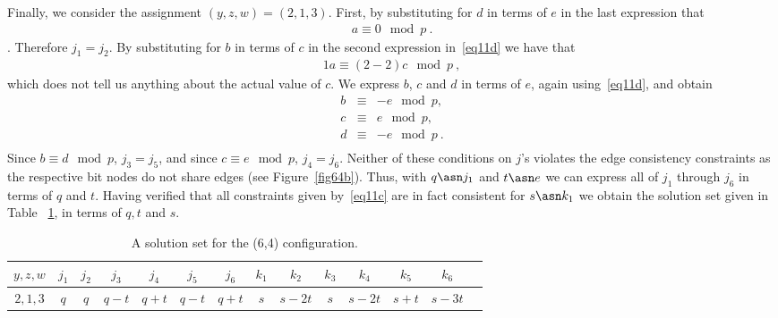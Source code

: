 Finally, we consider the assignment $(y,z,w)=(2,1,3)$. First, by
substituting for $d$ in terms of $e$ in the last expression that
\begin{eqnarray}
a \equiv 0 \mod p~.
\end{eqnarray}.
Therefore $j_1=j_2$. By substituting for $b$ in terms of $c$ in
the second expression in~\eqref{eq11d} we have that
\begin{eqnarray}
1a \equiv (2-2)c \mod p~,
\end{eqnarray}
which does not tell us anything about the actual value of $c$. We
express $b$, $c$ and $d$ in terms of $e$, again
using~\eqref{eq11d}, and obtain
\begin{equation}\label{eq11g}\begin{array}{cccc}
b &\equiv & -e \mod p, \\
c &\equiv & e \mod p, \\
d &\equiv & -e \mod p~. \\
\end{array}\end{equation}
Since $b \equiv d \mod p$, $j_3=j_5$, and since $c \equiv e \mod
p$, $j_4=j_6$. Neither of these conditions on $j$'s violates the
edge consistency constraints as the respective bit nodes do not
share edges (see Figure~\ref{fig64b}). Thus, with $q \asn j_1$ and
$t \asn e$ we can express all of $j_1$ through $j_6$ in terms of
$q$ and $t$. Having verified that all constraints given
by~\eqref{eq11c} are in fact consistent for $s \asn k_1$ we obtain
the solution set given in Table ~\ref{table64c}, in terms of $q,t$
and $s$.

\hspace{-0.2in}\small{\hspace{-0.2in}\begin{table}[ht]\vspace{-0.05in}\hspace{-0.2in}
\begin{tabular}{|c |c|c|c|c|c|c|c|c|c|c|c|c|c|}
  \hline
  $y,z,w$ & $j_1$ & $j_2$ & $j_3$ & $j_4$ & $j_5$ & $j_6$ & $k_1$ & $k_2$ & $k_3$ & $k_4$ & $k_5$ & $k_6$ \\
  \hline
$2,1,3$&  $q$ & $q$ &  $q-t$ &  $q+t$ &  $q-t$ & $q+t$ & $s$ &
$s-2t$ & $s$ & $s-2t$ & $s+t$ &
  $s-3t$\\
   \hline
\end{tabular}
\caption{ A solution set for the (6,4)
configuration.}\label{table64c}
\end{table}}
\normalsize

